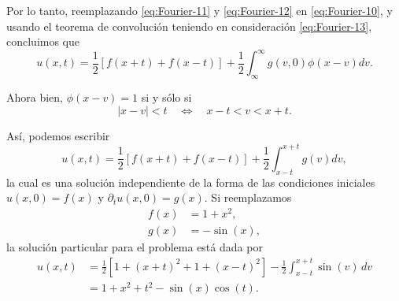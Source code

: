 \begin{ejemplo}
Por lo tanto, reemplazando \eqref{eq:Fourier-11} y \eqref{eq:Fourier-12} en \eqref{eq:Fourier-10}, y usando el teorema de convolución teniendo en consideración \eqref{eq:Fourier-13}, concluimos que
\begin{equation}
    u(x,t) = \frac{1}{2} [f(x + t) + f(x-t)] + \frac{1}{2} \int_{\infty}^{\infty} g(v,0) \phi(x - v) dv. 
\end{equation}

Ahora bien, $\phi(x - v) = 1$ si y sólo si
\begin{equation}
    |x - v| < t \quad \Leftrightarrow \quad x - t < v < x + t.
\end{equation}

Así, podemos escribir
\begin{equation}
    u(x,t) = \frac{1}{2} [f(x + t) + f(x-t)] + \frac{1}{2} \int_{x-t}^{x+t} g(v) dv, 
\end{equation}
la cual es una solución independiente de la forma de las condiciones iniciales $u(x,0) = f(x)$ y $\partial_{t} u(x,0) = g(x)$. Si reemplazamos 
\begin{align}
    f(x) &= 1 + x^2, \\
    g(x) &= - \sin(x),
\end{align}
la solución particular para el problema está dada por
\begin{align}
    u(x,t) &= \frac{1}{2}[1 + (x+t)^2 + 1 + (x-t)^2] - \frac{1}{2}   \int_{x-t}^{x+t} \sin(v) \,dv \nonumber \\
    &= 1 + x^2 + t^2 - \sin(x) \cos(t).
\end{align}

\end{ejemplo}




